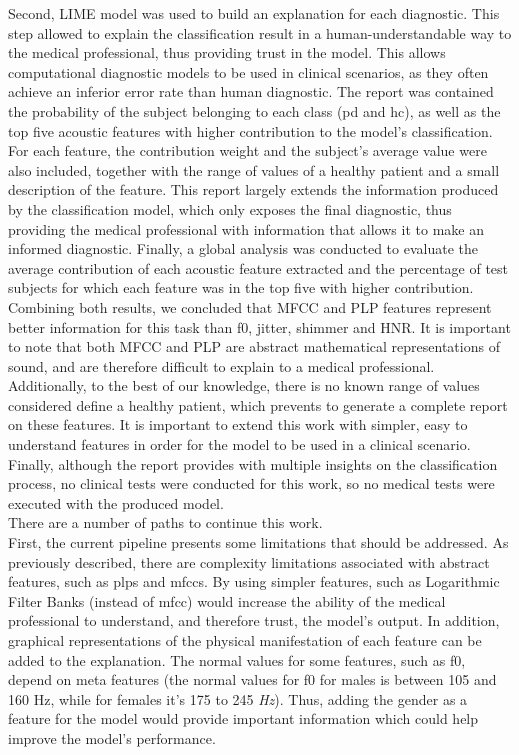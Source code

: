 Second, LIME model was used to build an explanation for each diagnostic. This step allowed to explain the classification result in a human-understandable way to the medical professional, thus providing trust in the model. This allows computational diagnostic models to be used in clinical scenarios, as they often achieve an inferior error rate than human diagnostic. The report was contained the probability of the subject belonging to each class (\gls{pd} and \gls{hc}), as well as the top five acoustic features with higher contribution to the model's classification. For each feature, the contribution weight and the subject's average value were also included, together with the range of values of a healthy patient and a small description of the feature. This report largely extends the information produced by the classification model, which only exposes the final diagnostic, thus providing the medical professional with information that allows it to make an informed diagnostic. Finally, a global analysis was conducted to evaluate the average contribution of each acoustic feature extracted and the percentage of test subjects for which each feature was in the top five with higher contribution. Combining both results, we concluded that MFCC and PLP features represent better information for this task than \gls{f0}, jitter, shimmer and HNR.
It is important to note that both MFCC and PLP are abstract mathematical representations of sound, and are therefore difficult to explain to a medical professional. Additionally, to the best of our knowledge, there is no known range of values considered define a healthy patient, which prevents to generate a complete report on these features. It is important to extend this work with simpler, easy to understand features in order for the model to be used in a clinical scenario. Finally, although the report provides with multiple insights on the classification process, no clinical tests were conducted for this work, so no medical tests were executed with the produced model. \\
There are a number of paths to continue this work. \\
First, the current pipeline presents some limitations that should be addressed. As previously described, there are complexity limitations associated with abstract features, such as \gls{plp}s and \gls{mfcc}s. By using simpler features, such as Logarithmic Filter Banks (instead of \gls{mfcc}) would increase the ability of the medical professional to understand, and therefore trust, the model's output. In addition, graphical representations of the physical manifestation of each feature can be added to the explanation. The normal values for some features, such as \gls{f0}, depend on meta features (the normal values for \gls{f0} for males is between 105 and 160 Hz, while for females it's 175 to 245 \textit{Hz}). Thus, adding the gender as a feature for the model would provide important information which could help improve the model's performance. \\
